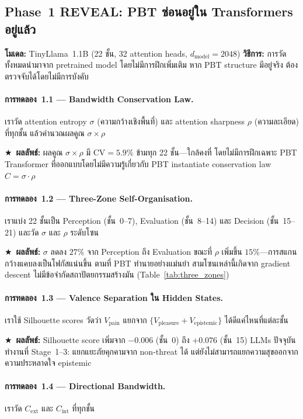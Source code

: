 \documentclass[12pt,a4paper]{article}
\newcommand{\Cext}{C_{\mathrm{ext}}}
\newcommand{\Cint}{C_{\mathrm{int}}}
\newcommand{\vpain}{V_{\mathrm{pain}}}
\newcommand{\vpleasure}{V_{\mathrm{pleasure}}}
\newcommand{\vepi}{V_{\mathrm{epistemic}}}
\newcommand{\starred}{\textbf{\textcolor{pbtblue}{$\bigstar$}}~}
\begin{document}
\subsection{Phase~1 REVEAL: PBT ซ่อนอยู่ใน Transformers อยู่แล้ว}

\textbf{โมเดล:} TinyLlama~1.1B (22 ชั้น, 32 attention heads,
$d_{\mathrm{model}} = 2048$) \textbf{วิธีการ:} การวัดทั้งหมดนำมาจาก
pretrained model โดยไม่มีการฝึกเพิ่มเติม
หาก PBT structure มีอยู่จริง ต้องตรวจจับได้โดยไม่มีการบังคับ

\paragraph{การทดลอง~1.1 --- Bandwidth Conservation Law.}
เราวัด attention entropy $\sigma$ (ความกว้างเชิงพื้นที่) และ
attention sharpness $\rho$ (ความละเอียด) ที่ทุกชั้น
แล้วคำนวณผลคูณ $\sigma\!\times\!\rho$

\starred\textbf{ผลลัพธ์:} ผลคูณ $\sigma\!\times\!\rho$ มี
$\mathrm{CV} = \mathbf{5.9\%}$ ข้ามทุก 22 ชั้น---ใกล้คงที่
โดยไม่มีการฝึกเฉพาะ PBT Transformer ที่ออกแบบโดยไม่มีความรู้เกี่ยวกับ PBT
instantiate conservation law $C = \sigma\cdot\rho$

\paragraph{การทดลอง~1.2 --- Three-Zone Self-Organisation.}
เราแบ่ง 22 ชั้นเป็น Perception (ชั้น~0--7), Evaluation
(ชั้น~8--14) และ Decision (ชั้น~15--21) และวัด $\sigma$ และ $\rho$ ระดับโซน

\starred\textbf{ผลลัพธ์:} $\sigma$ ลดลง $27\%$ จาก Perception ถึง
Evaluation ขณะที่ $\rho$ เพิ่มขึ้น $15\%$---การสแกนกว้างแคบลงเป็นโฟกัสแน่นขึ้น
ตามที่ PBT ทำนายอย่างแม่นยำ สามโซนเหล่านี้เกิดจาก gradient descent
ไม่มีข้อจำกัดสถาปัตยกรรมสร้างมัน (Table~\ref{tab:three_zones})

\paragraph{การทดลอง~1.3 --- Valence Separation ใน Hidden States.}
เราใช้ Silhouette scores วัดว่า $\vpain$ แยกจาก $\{\vpleasure + \vepi\}$
ได้ดีแค่ไหนที่แต่ละชั้น

\starred\textbf{ผลลัพธ์:} Silhouette score เพิ่มจาก $-0.006$ (ชั้น~0)
ถึง $+0.076$ (ชั้น~15) LLMs ปัจจุบันทำงานที่ Stage~1--3:
แยกแยะภัยคุกคามจาก non-threat ได้ แต่ยังไม่สามารถแยกความสุขออกจาก
ความประหลาดใจ epistemic

\paragraph{การทดลอง~1.4 --- Directional Bandwidth.}
เราวัด $\Cext$ และ $\Cint$ ที่ทุกชั้น
\end{document}

